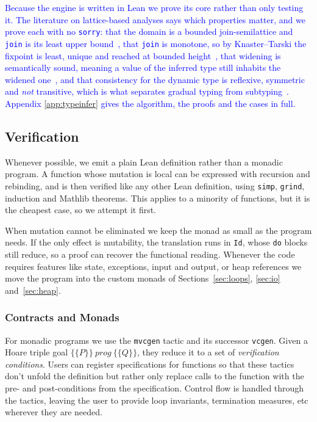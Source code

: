 \documentclass{article}
\newcommand{\code}{\lstinline}
\newcommand{\suggest}[1]{\textcolor{blue}{#1}}
\begin{document}
\suggest{Because the engine is written in Lean we prove its core rather than only testing it. The literature on lattice-based analyses says which properties matter, and we prove each with no \code{sorry}: that the domain is a bounded join-semilattice and \code{join} is its least upper bound~\cite{davey2002lattices}, that \code{join} is monotone, so by Knaster--Tarski the fixpoint is least, unique and reached at bounded height~\cite{tarski1955fixpoint}, that widening is semantically sound, meaning a value of the inferred type still inhabits the widened one~\cite{milner1978polymorphism,wright1994soundness}, and that consistency for the dynamic type is reflexive, symmetric and \emph{not} transitive, which is what separates gradual typing from subtyping~\cite{siek2015refined}. Appendix \ref{app:typeinfer} gives the algorithm, the proofs and the cases in full.}


\subsection{Verification}

Whenever possible, we emit a plain Lean definition rather than a monadic program. A function whose
mutation is local can be expressed with recursion and rebinding, and is then verified like
any other Lean definition, using \code{simp}, \code{grind}, induction and Mathlib theorems. This applies to a
minority of functions, but it is the cheapest case, so we attempt it first. 

When mutation cannot be
eliminated we keep the monad as small as the program needs. If the only effect is mutability, the
translation runs in \code{Id}, whose \code{do} blocks still reduce, so a proof can recover the
functional reading. Whenever the code requires features like state, exceptions, input and output, or heap references we move the program
into the custom monads of Sections~\ref{sec:loops}, \ref{sec:io} and~\ref{sec:heap}.

\subsubsection{Contracts and Monads}

For monadic programs we use the \code{mvcgen} tactic and its successor \code{vcgen}. Given a Hoare triple goal
$\lbrace\!\lbrace P \rbrace\!\rbrace\ \mathit{prog}\ \lbrace\!\lbrace Q \rbrace\!\rbrace$, they reduce
it to a set of \emph{verification conditions}. Users can register specifications for functions so that these tactics don't unfold the definition but rather only replace calls to the function with the pre- and post-conditions from the specification. Control flow is handled through the tactics, leaving the user to provide loop invariants, termination measures, etc wherever they are needed.
\end{document}
